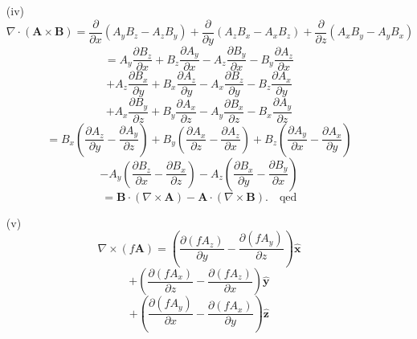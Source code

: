 \documentclass[a4paper,12pt]{article}
\begin{document}
\begin{itemize}
    \item[(iv)]
    \begin{equation}
    \nabla \cdot (\mathbf{A} \times \mathbf{B}) = \frac{\partial}{\partial x} (A_y B_z - A_z B_y) + \frac{\partial}{\partial y} (A_z B_x - A_x B_z) + \frac{\partial}{\partial z} (A_x B_y - A_y B_x)
    \end{equation}
    \begin{equation}
    = A_y \frac{\partial B_z}{\partial x} + B_z \frac{\partial A_y}{\partial x} - A_z \frac{\partial B_y}{\partial x} - B_y \frac{\partial A_z}{\partial x} 
    \end{equation}
    \begin{equation}
    + A_z \frac{\partial B_x}{\partial y} + B_x \frac{\partial A_z}{\partial y} - A_x \frac{\partial B_z}{\partial y} - B_z \frac{\partial A_x}{\partial y}
    \end{equation}
    \begin{equation}
    + A_x \frac{\partial B_y}{\partial z} + B_y \frac{\partial A_x}{\partial z} - A_y \frac{\partial B_x}{\partial z} - B_x \frac{\partial A_y}{\partial z}
    \end{equation}
    \begin{equation}
    = B_x \left( \frac{\partial A_z}{\partial y} - \frac{\partial A_y}{\partial z} \right) + B_y \left( \frac{\partial A_x}{\partial z} - \frac{\partial A_z}{\partial x} \right) + B_z \left( \frac{\partial A_y}{\partial x} - \frac{\partial A_x}{\partial y} \right)
    \end{equation}
    \begin{equation}
    - A_y \left( \frac{\partial B_z}{\partial x} - \frac{\partial B_x}{\partial z} \right) - A_z \left( \frac{\partial B_x}{\partial y} - \frac{\partial B_y}{\partial x} \right)
    \end{equation}
    \begin{equation}
    = \mathbf{B} \cdot (\nabla \times \mathbf{A}) - \mathbf{A} \cdot (\nabla \times \mathbf{B}). \quad \text{qed}
    \end{equation}

    \item[(v)]
    \begin{equation}
    \nabla \times (f \mathbf{A}) = \left( \frac{\partial (f A_z)}{\partial y} - \frac{\partial (f A_y)}{\partial z} \right) \hat{\mathbf{x}} 
    \end{equation}
    \begin{equation}
    + \left( \frac{\partial (f A_x)}{\partial z} - \frac{\partial (f A_z)}{\partial x} \right) \hat{\mathbf{y}} 
    \end{equation}
    \begin{equation}
    + \left( \frac{\partial (f A_y)}{\partial x} - \frac{\partial (f A_x)}{\partial y} \right) \hat{\mathbf{z}}
    \end{equation}


\end{itemize}
\end{document}
